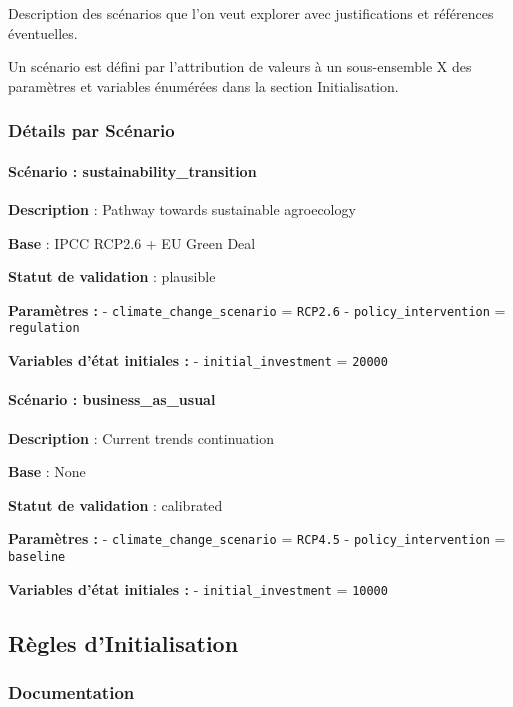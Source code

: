 \documentclass[
]{article}
\begin{document}
Description des scénarios que l'on veut explorer avec justifications et
références éventuelles.

Un scénario est défini par l'attribution de valeurs à un sous-ensemble X
des paramètres et variables énumérées dans la section Initialisation.

\subsubsection{Détails par Scénario}\label{duxe9tails-par-scuxe9nario}

\paragraph{Scénario :
sustainability\_transition}\label{scuxe9nario-sustainability_transition}

\textbf{Description} : Pathway towards sustainable agroecology

\textbf{Base} : IPCC RCP2.6 + EU Green Deal

\textbf{Statut de validation} : plausible

\textbf{Paramètres :} - \texttt{climate\_change\_scenario} =
\texttt{RCP2.6} - \texttt{policy\_intervention} = \texttt{regulation}

\textbf{Variables d'état initiales :} - \texttt{initial\_investment} =
\texttt{20000}

\paragraph{Scénario :
business\_as\_usual}\label{scuxe9nario-business_as_usual}

\textbf{Description} : Current trends continuation

\textbf{Base} : None

\textbf{Statut de validation} : calibrated

\textbf{Paramètres :} - \texttt{climate\_change\_scenario} =
\texttt{RCP4.5} - \texttt{policy\_intervention} = \texttt{baseline}

\textbf{Variables d'état initiales :} - \texttt{initial\_investment} =
\texttt{10000}

\subsection{Règles d'Initialisation}\label{ruxe8gles-dinitialisation}

\subsubsection{Documentation}\label{documentation-23}
\end{document}
